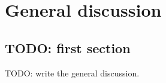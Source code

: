 \chapter{General discussion}\label{chap: discussion}
\newpage
{}

\section{TODO: first section}
TODO: write the general discussion.
